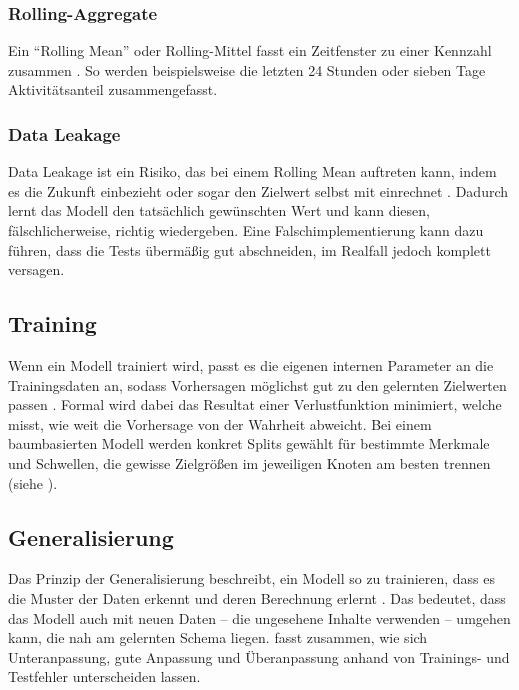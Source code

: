 \subsubsection{Rolling-Aggregate}

Ein \enquote{Rolling Mean} oder Rolling-Mittel fasst ein Zeitfenster zu einer Kennzahl zusammen \parencite[Kap. 3.3]{hyndman2021forecasting}. So werden beispielsweise die letzten 24 Stunden oder sieben Tage Aktivitätsanteil zusammengefasst. 

\subsubsection{Data Leakage}  Data Leakage ist ein Risiko, das bei einem Rolling Mean auftreten kann, indem es die Zukunft einbezieht oder sogar den Zielwert selbst mit einrechnet \parencite{kaufman2012leakage}. Dadurch lernt das Modell den tatsächlich gewünschten Wert und kann diesen, fälschlicherweise, richtig wiedergeben. Eine Falschimplementierung kann dazu führen, dass die Tests übermäßig gut abschneiden, im Realfall jedoch komplett versagen.

\subsection{Training}

Wenn ein Modell trainiert wird, passt es die eigenen internen Parameter an die Trainingsdaten an, sodass Vorhersagen möglichst gut zu den gelernten Zielwerten passen \parencite[Kap. 1.5]{bishop2006prml}. Formal wird dabei das Resultat einer Verlustfunktion minimiert, welche misst, wie weit die Vorhersage von der Wahrheit abweicht. Bei einem baumbasierten Modell werden konkret Splits gewählt für bestimmte Merkmale und Schwellen, die gewisse Zielgrößen im jeweiligen Knoten am besten trennen (siehe ).

\subsection{Generalisierung}

Das Prinzip der Generalisierung beschreibt, ein Modell so zu trainieren, dass es die Muster der Daten erkennt und deren Berechnung erlernt \parencite[Kap. 7.2]{hastie2009elements}. Das bedeutet, dass das Modell auch mit neuen Daten -- die ungesehene Inhalte verwenden -- umgehen kann, die nah am gelernten Schema liegen.  fasst zusammen, wie sich Unteranpassung, gute Anpassung und Überanpassung anhand von Trainings- und Testfehler unterscheiden lassen.


